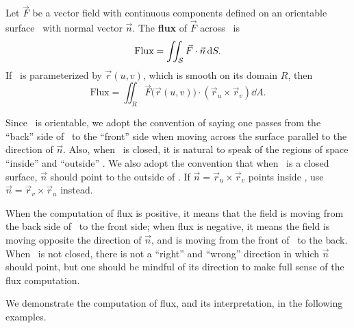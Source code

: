 \begin{definition}\label{def:surfflux}%
Let $\vec F$ be a vector field with continuous components defined on an orientable surface \surfaceS\ with normal vector $\vec n$. The \textbf{flux} of $\vec F$ across \surfaceS\ is
\[\text{Flux} = \iint_{\mathcal{S}} \vec F\cdot \vec n\operatorname{d}\! S.\]
If \surfaceS\ is parameterized by $\vec r(u,v)$, which is smooth on its domain $R$, then
\[
\text{Flux} = \iint_R \vec F\bigl(\vec r(u,v)\bigr)\cdot (\vec r_u\times \vec r_v)\dd A.
\]
\end{definition}

Since \surfaceS\ is orientable, we adopt the convention of saying one passes from the ``back'' side of \surfaceS\ to the ``front'' side when moving across the surface parallel to the direction of $\vec n$. Also, when \surfaceS\ is closed, it is natural to speak of the regions of space ``inside'' and ``outside'' \surfaceS. We also adopt the convention that when \surfaceS\ is a closed surface, $\vec n$ should point to the outside of \surfaceS. If $\vec n = \vec r_u\times\vec r_v$ points inside \surfaceS, use $\vec n = \vec r_v\times \vec r_u$ instead.

When the computation of flux is positive, it means that the field is moving from the back side of \surfaceS\ to the front side; when flux is negative, it means the field is moving opposite the direction of $\vec n$, and is moving from the front of \surfaceS\ to the back. When \surfaceS\ is not closed, there is not a ``right'' and ``wrong'' direction in which $\vec n$ should point, but one should be mindful of its direction to make full sense of the flux computation.

We demonstrate the computation of flux, and its interpretation, in the following examples.


